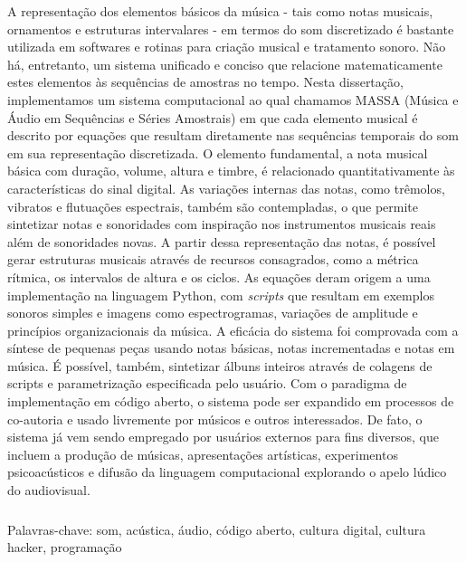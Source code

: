 \begin{resumo}

A representação dos elementos básicos da música - tais como notas musicais, ornamentos e estruturas intervalares - em termos do som discretizado é bastante utilizada em softwares e rotinas para criação musical e tratamento sonoro. Não há, entretanto, um sistema unificado e conciso que relacione matematicamente estes elementos às sequências de amostras no tempo. Nesta dissertação, implementamos um sistema computacional ao qual chamamos MASSA (Música e Áudio em Sequências e Séries Amostrais) em que cada elemento musical é descrito por equações que resultam diretamente nas sequências temporais do som em sua representação discretizada. O elemento fundamental, a nota musical básica com duração, volume, altura e timbre, é relacionado quantitativamente às características do sinal digital. As variações internas das notas, como trêmolos, vibratos e flutuações espectrais, também são contempladas, o que permite sintetizar notas e sonoridades com inspiração nos instrumentos musicais reais além de sonoridades novas. A partir dessa representação das notas, é possível gerar estruturas musicais através de recursos consagrados, como a métrica rítmica, os intervalos de altura e os ciclos. As equações deram origem a uma implementação na linguagem Python, com \emph{scripts} que resultam em exemplos sonoros simples e imagens como espectrogramas, variações de amplitude e princípios organizacionais da música. A eficácia do sistema foi comprovada com a síntese de pequenas peças usando notas básicas, notas incrementadas e notas em música. É possível, também, sintetizar álbuns inteiros através de colagens de scripts e parametrização especificada pelo usuário. Com o paradigma de implementação em código aberto, o sistema pode ser expandido em processos de co-autoria e usado livremente por músicos e outros interessados. De fato, o sistema já vem sendo empregado por usuários externos para fins diversos, que incluem a produção de músicas, apresentações artísticas, experimentos psicoacústicos e difusão da linguagem computacional explorando o apelo lúdico do audiovisual.


$\phantom{linha em branco}$\\
Palavras-chave: som, acústica, áudio, código aberto, cultura digital, cultura hacker, programação

\end{resumo}


\afterpage{\blankpage}

